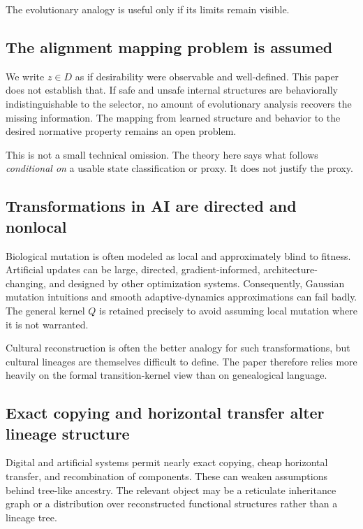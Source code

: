 \documentclass[11pt]{article}
\begin{document}
The evolutionary analogy is useful only if its limits remain visible.

\subsection{The alignment mapping problem is assumed}

We write $z\in D$ as if desirability were observable and well-defined. This paper does not establish that. If safe and unsafe internal structures are behaviorally indistinguishable to the selector, no amount of evolutionary analysis recovers the missing information. The mapping from learned structure and behavior to the desired normative property remains an open problem.

This is not a small technical omission. The theory here says what follows \emph{conditional on} a usable state classification or proxy. It does not justify the proxy.

\subsection{Transformations in AI are directed and nonlocal}

Biological mutation is often modeled as local and approximately blind to fitness. Artificial updates can be large, directed, gradient-informed, architecture-changing, and designed by other optimization systems. Consequently, Gaussian mutation intuitions and smooth adaptive-dynamics approximations can fail badly. The general kernel $Q$ is retained precisely to avoid assuming local mutation where it is not warranted.

Cultural reconstruction is often the better analogy for such transformations, but cultural lineages are themselves difficult to define. The paper therefore relies more heavily on the formal transition-kernel view than on genealogical language.

\subsection{Exact copying and horizontal transfer alter lineage structure}

Digital and artificial systems permit nearly exact copying, cheap horizontal transfer, and recombination of components. These can weaken assumptions behind tree-like ancestry. The relevant object may be a reticulate inheritance graph or a distribution over reconstructed functional structures rather than a lineage tree.
\end{document}
